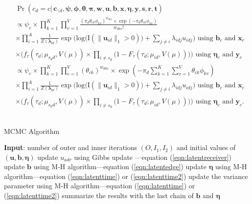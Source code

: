 \documentclass[ba]{imsart}
\def\spacingset#1{\renewcommand{\baselinestretch}%
	{#1}\small\normalsize} \spacingset{1}
\numberwithin{equation}{section}
\theoremstyle{plain}
\begin{document}
				\begin{equation}
				\begin{aligned}
				&	\Pr(c_d=c|\,\boldsymbol{c}_{\backslash d},\boldsymbol{\psi},\boldsymbol{\phi},\boldsymbol{\theta},\boldsymbol{\pi},\boldsymbol{w},\boldsymbol{u},\boldsymbol{b},\boldsymbol{x},\boldsymbol{\eta},\boldsymbol{y},\boldsymbol{s}, \boldsymbol{r},\boldsymbol{t}) \\& \propto \psi_c \times 	\prod_{k=1}^K\prod_{v=1}^V \frac{(\pi_{d} \theta_{ck}\phi_{kv})^{w_{dkv}}\times \exp(-\pi_{d} \theta_{ck}\phi_{kv})}{w_{dkv}!}\\& \times \prod_{i=1}^A \frac{1}{Z(\boldsymbol{\lambda}_{id})}\exp\Big(\mbox{log}\big(\text{I}( \lVert \boldsymbol{u}_{id}\rVert_1 > 0 )\big) + \sum_{j\neq i} \lambda_{idj}u_{idj}\Big) \mbox{ using } \boldsymbol{b}_c \mbox{ and }\boldsymbol{x}_c  \\&\times \Big(f_{\tau}(\tau_{d}; \mu_{s_d d}, V(\mu))\times \prod_{i\neq s_d}\big(1-F_{\tau}(\tau_{d}; \mu_{id}, V(\mu)) \big)\Big)\mbox{ using } \boldsymbol{\eta}_c \mbox{ and }\boldsymbol{y}_c \\&\propto
				 \psi_c \times 	\prod_{k=1}^K\prod_{v=1}^V {( \theta_{ck})^{w_{dkv}}\times \exp(-\pi_{d} \sum_{k=1}^K\sum_{v=1}^V \theta_{ck}\phi_{kv})}\\& \times \prod_{i=1}^A \frac{1}{Z(\boldsymbol{\lambda}_{id})}\exp\Big(\mbox{log}\big(\text{I}( \lVert \boldsymbol{u}_{id}\rVert_1 > 0 )\big) + \sum_{j\neq i} \lambda_{idj}u_{idj}\Big) \mbox{ using } \boldsymbol{b}_c \mbox{ and }\boldsymbol{x}_c  \\&\times \Big(f_{\tau}(\tau_{d}; \mu_{s_d d}, V(\mu))\times \prod_{i\neq s_d}\big(1-F_{\tau}(\tau_{d}; \mu_{id}, V(\mu)) \big)\Big)\mbox{ using } \boldsymbol{\eta}_c \mbox{ and }\boldsymbol{y}_c.
				\end{aligned}	
				\end{equation}
	~				
	\begin{algorithm}[!t]
		\spacingset{1}
		\SetAlgoLined
		\caption{MCMC Algorithm}
		\begin{algorithmic}
			\STATE \textbf{Input}: number of outer and inner iterations $(O, I_1, I_2)$ and initial values of $(\boldsymbol{u}, \boldsymbol{b}, \boldsymbol{\eta})$
			\vskip 0.1in
			\STATE update $u_{adr}$ using Gibbs update ---equation (\ref{eqn:latentreceiver})
			\ENDFOR
			\ENDFOR
			\ENDFOR
			\STATE update $\boldsymbol{b}$ using M-H algorithm---equation (\ref{eqn:latentedge})
			\ENDFOR
			\STATE update $\boldsymbol{\eta}$ using M-H algorithm---equation (\ref{eqn:latenttime}) or (\ref{eqn:latenttime2}) 
			\ENDFOR
			\STATE update the variance parameter using M-H algorithm---equation (\ref{eqn:latenttime}) or (\ref{eqn:latenttime2}) 
			\ENDIF
			\ENDFOR
			\STATE	summarize the results with the last chain of $\boldsymbol{b}$ and $\boldsymbol{\eta}$
		\end{algorithmic}
		\label{alg:MCMC}
	\end{algorithm}
\end{document}

